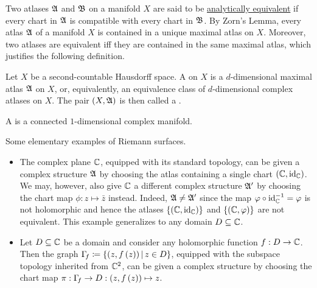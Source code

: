 \documentclass[../Moduli_Spaces_of_Riemann_Surfaces.tex]{subfiles}
\begin{document}
    \begin{remark}
        Two atlases $\mathfrak{A}$ and $\mathfrak{B}$ on a manifold $X$ are said to be \ul{analytically equivalent} if every chart in $\mathfrak{A}$ is compatible with every chart in $\mathfrak{B}$. By Zorn's Lemma, every atlas $\mathfrak{A}$ of a manifold $X$ is contained in a unique maximal atlas on $X$. Moreover, two atlases are equivalent iff they are contained in the same maximal atlas, which justifies the following definition.\exqed
    \end{remark}
    \begin{definition}
        Let $X$ be a second-countable Hausdorff space. A   on $X$ is a $d$-dimensional maximal atlas $\mathfrak{A}$ on $X$, or, equivalently, an equivalence class of $d$-dimensional complex atlases on $X$. The pair $\left(X,\mathfrak{A}\right)$ is then called a  .
    \end{definition}
    \begin{definition}
        A  is a connected $1$-dimensional complex manifold.
    \end{definition}
    \begin{example}
        Some elementary examples of Riemann surfaces.
        \begin{itemize}
            \item The complex plane $\mathbb{C}$, equipped with its standard topology, can be given a complex structure $\mathfrak{A}$ by choosing the atlas containing a single chart $\left(\mathbb{C},\operatorname{id}_{\mathbb{C}}\right)$. We may, however, also give $\mathbb{C}$ a different complex structure $\mathfrak{A}'$ by choosing the chart map $\phi:z\mapsto\bar{z}$ instead. Indeed, $\mathfrak{A}\neq\mathfrak{A}'$ since the map $\varphi\circ\operatorname{id}_{\mathbb{C}}^{-1}=\varphi$ is not holomorphic and hence the atlases $\left\{\left(\mathbb{C},\operatorname{id}_{\mathbb{C}}\right)\right\}$ and $\left\{\left(\mathbb{C},\varphi\right)\right\}$ are not equivalent. This example generalizes to any domain $D\subseteq\mathbb{C}$.
            \item Let $D\subseteq\mathbb{C}$ be a domain and consider any holomorphic function $f:D\to\mathbb{C}$. Then the graph $\Gamma\!_f\coloneqq\left\{\left(z,f\left(z\right)\right)\,\middle\vert\, z\in D\right\}$, equipped with the subspace topology inherited from $\mathbb{C}^2$, can be given a complex structure by choosing the chart map $\pi:\Gamma\!_f\to D:\left(z,f\left(z\right)\right)\mapsto z$.\exqed
        \end{itemize}
    \end{example}
\end{document}

